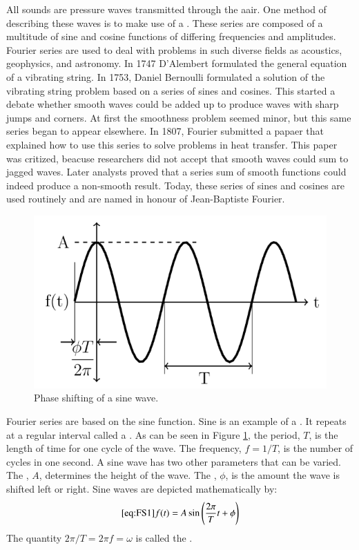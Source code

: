 All sounds are pressure waves transmitted through the aair. One method of describing these waves is to make use of a . These series are composed of a multitude of sine and cosine functions of differing frequencies and amplitudes. Fourier series are used to deal with problems in such diverse fields as acoustics, geophysics, and astronomy. In 1747 D'Alembert formulated the general equation of a vibrating string. In 1753, Daniel Bernoulli formulated a solution of the vibrating string problem based on a series of sines and cosines. This started a debate whether smooth waves could be added up to produce waves with sharp jumps and corners. At first the smoothness problem seemed minor, but this same series began to appear elsewhere. In 1807, Fourier submitted a papaer that explained how to use this series to solve problems in heat transfer. This paper was critized, beacuse researchers did not accept that smooth waves could sum to jagged waves. Later analysts proved that a series sum of smooth functions could indeed produce a non-smooth result. Today, these series of sines and cosines are used routinely and are named  in honour of Jean-Baptiste Fourier.

\begin{figure}[H]
    \centering
    \includegraphics[scale = 0.8]{Images/FS2.PNG}
    \caption{Phase shifting of a sine wave.}
    \label{fig:FS2}
\end{figure}

Fourier series are based on the sine function. Sine is an example of a . It repeats at a regular interval called a . As can be seen in Figure \ref{fig:FS2}, the period, $T$, is the length of time for one cycle of the wave. The frequency, $f = 1/T$, is the number of cycles in one second. A sine wave has two other parameters that can be varied. The , $A$, determines the height of the wave. The , $\phi$, is the amount the wave is shifted left or right. Sine waves are depicted mathematically by: \begin{equation}\ref{eq:FS1}
    f(t) = A\sin\left(\frac{2\pi}{T}t+\phi\right)
\end{equation}
The quantity $2\pi/T = 2\pi f = \omega$ is called the .

